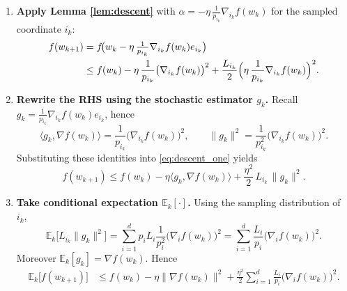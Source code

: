 \documentclass{article}
\begin{document}
\begin{enumerate}
    \item[Step 1.] \textbf{Apply Lemma \ref{lem:descent}} with $\alpha=-\eta\,\frac{1}{p_{i_k}}\nabla_{i_k}f(w_k)$ for the sampled coordinate $i_k$:
    \begin{align}
        f(w_{k+1})
        &= f\!\bigl(w_k-\eta\,\tfrac{1}{p_{i_k}}\nabla_{i_k}f(w_k)e_{i_k}\bigr) \nonumber\\
        &\le f(w_k)
           -\eta\,\frac{1}{p_{i_k}}\bigl(\nabla_{i_k}f(w_k)\bigr)^2
           +\frac{L_{i_k}}{2}\Bigl(\eta\,\frac{1}{p_{i_k}}\nabla_{i_k}f(w_k)\Bigr)^2 .
        \label{eq:descent_one}
    \end{align}

    \item[Step 2.] \textbf{Rewrite the RHS using the stochastic estimator $g_k$.}
    Recall $g_k=\frac{1}{p_{i_k}}\nabla_{i_k}f(w_k)e_{i_k}$, hence
    \[
        \langle g_k,\nabla f(w_k)\rangle
        =\frac{1}{p_{i_k}}\bigl(\nabla_{i_k}f(w_k)\bigr)^2,
        \qquad
        \|g_k\|^2
        =\frac{1}{p_{i_k}^2}\bigl(\nabla_{i_k}f(w_k)\bigr)^2 .
    \]
    Substituting these identities into \eqref{eq:descent_one} yields
    \begin{equation}
        f(w_{k+1})
        \le f(w_k)
           -\eta\langle g_k,\nabla f(w_k)\rangle
           +\frac{\eta^{2}}{2}\,L_{i_k}\,\|g_k\|^{2}.
        \label{eq:descent_two}
    \end{equation}

    \item[Step 3.] \textbf{Take conditional expectation $\mathbb{E}_k[\cdot]$.}
    Using the sampling distribution of $i_k$,
    \[
        \mathbb{E}_k\!\bigl[L_{i_k}\|g_k\|^{2}\bigr]
        =\sum_{i=1}^{d}p_i L_i\frac{1}{p_i^{2}}\bigl(\nabla_i f(w_k)\bigr)^{2}
        =\sum_{i=1}^{d}\frac{L_i}{p_i}\bigl(\nabla_i f(w_k)\bigr)^{2}.
    \]
    Moreover $\mathbb{E}_k[g_k]=\nabla f(w_k)$. Hence
    \begin{align}
        \mathbb{E}_k\!\bigl[f(w_{k+1})\bigr]
        &\le f(w_k)
           -\eta\|\nabla f(w_k)\|^{2}
           +\frac{\eta^{2}}{2}\sum_{i=1}^{d}\frac{L_i}{p_i}\bigl(\nabla_i f(w_k)\bigr)^{2}.
        \label{eq:exp_descent}
    \end{align}


\end{enumerate}
\end{document}
